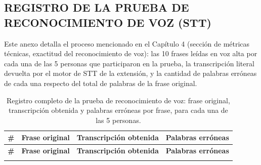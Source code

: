 \subsection{REGISTRO DE LA PRUEBA DE RECONOCIMIENTO DE VOZ (STT)}
\label{anexo:stt}

Este anexo detalla el proceso mencionado en el Capítulo 4 (sección de métricas técnicas, exactitud del reconocimiento de voz): las 10 frases leídas en voz alta por cada una de las 5 personas que participaron en la prueba, la transcripción literal devuelta por el motor de STT de la extensión, y la cantidad de palabras erróneas de cada una respecto del total de palabras de la frase original.

\begin{longtable}{|p{0.5cm}|p{5.7cm}|p{5.7cm}|p{1.5cm}|}
    \caption{\label{table:transcripcionesstt}Registro completo de la prueba de reconocimiento de voz: frase original, transcripción obtenida y palabras erróneas por frase, para cada una de las 5 personas.} \\
    \hline
    \textbf{\#} & \textbf{Frase original} & \textbf{Transcripción obtenida} & \textbf{Palabras erróneas} \\
    \hline
    \endfirsthead
    \hline
    \textbf{\#} & \textbf{Frase original} & \textbf{Transcripción obtenida} & \textbf{Palabras erróneas} \\
    \hline
    \endhead
    \hline
    \endfoot


\end{longtable}
